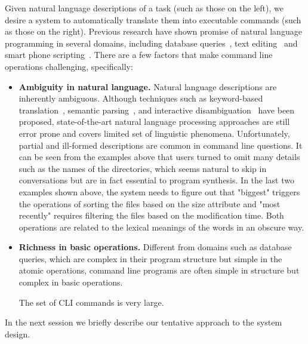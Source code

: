 Given natural language descriptions of a task (such as those on the left), we desire a system to automatically translate them into executable commands (such as those on the right). 
Previous research have shown promise of natural language programming in several domains, including database queries~\cite{DBLP:journals/pvldb/LiJ14, DBLP:conf/sigmod/GulwaniM14}, text editing~\cite{DBLP:journals/corr/DesaiGHJKMRR15} and smart phone scripting~\cite{DBLP:conf/mobisys/LeGS13}. 
There are a few factors that make command line operations challenging, specifically:
\begin{itemize}
\item \textbf{Ambiguity in natural language.} Natural language descriptions are inherently ambiguous. Although techniques such as keyword-based translation~\cite{DBLP:conf/sigmod/GulwaniM14}, semantic parsing~\citep{Zettlemoyer05learningto}, and interactive disambiguation~\cite{DBLP:journals/pvldb/LiJ14} have been proposed, state-of-the-art natural language processing approaches are still error prone and covers limited set of linguistic phenomena.
Unfortunately, partial and ill-formed descriptions are common in command line questions. It can be seen from the examples above that users turned to omit many details such as the names of the directories, which seems natural to skip in conversations but are in fact essential to program synthesis. In the last two examples shown above, the system needs to figure out that "biggest" triggers the operations of sorting the files based on the size attribute and "most recently" requires filtering the files based on the modification time. Both operations are related to the lexical meanings of the words in an obscure way.

\item \textbf{Richness in basic operations.} Different from domains such as database queries, which are complex in their program structure but simple in the atomic operations, command line programs are often simple in structure but complex in basic operations. 

The set of CLI commands is very large.
\end{itemize}

In the next session we briefly describe our tentative approach to the system design.